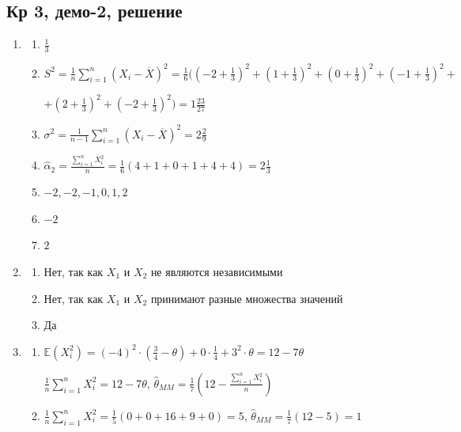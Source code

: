 \documentclass[12pt, a4paper]{article}\usepackage[]{graphicx}\usepackage[]{color}
\begin{document}
\subsection{Кр 3, демо-2, решение}



\begin{enumerate}
	\item
		\begin{enumerate}
			\item $\frac{1}{3}$
			\item
					$S^2 = \frac{1}{n} \sum_{i=1}^n (X_i - \overline{X})^2 = \frac{1}{6} ( \left(-2 + \frac{1}{3}\right)^2 + \left(1 + \frac{1}{3} \right)^2 + \left(0 + \frac{1}{3}\right)^2 + \left(-1 + \frac{1}{3}\right)^2 + $

					$   + \left(2+ \frac{1}{3}\right)^2 + \left(-2+ \frac{1}{3}\right)^2 ) = 1\frac{23}{27}$

			\item $\sigma^2 = \frac{1}{n-1} \sum_{i=1}^n (X_i - \overline{X})^2 =2 \frac{2}{9}$
			\item $\hat{\alpha}_2 = \frac{\sum_{i=1}^n X_i^2}{n} = \frac{1}{6} (4 + 1 + 0 + 1 + 4 + 4) = 2\frac{1}{3}$
			\item $-2, -2, -1, 0, 1, 2$
			\item $-2$
			\item $2$
		\end{enumerate}

	\item
		\begin{enumerate}
			\item Нет,  так как $X_1$ и  $X_2$ не являются независимыми
			\item Нет,  так как $X_1$ и  $X_2$ принимают разные множества значений
			\item Да
		\end{enumerate}

	\item
		\begin{enumerate}
			\item $\mathbb{E}(X_i^2) = (-4)^2 \cdot \left(\frac{3}{4} - \theta\right) + 0\cdot \frac{1}{4}+ 3^2 \cdot \theta = 12 - 7\theta$

			$\frac{1}{n} \sum_{i=1}^n X_i^2 = 12 - 7\theta$, $\hat{\theta}_{MM} = \frac{1}{7} \left(12-\frac{\sum_{i=1}^n X_i^2}{n} \right)$
			\item $\frac{1}{n}\sum_{i=1}^n X_i^2 = \frac{1}{5}(0 + 0 + 16  + 9+ 0) = 5$, $\hat{\theta}_{MM} =\frac{1}{7} (12-5)= 1$
		\end{enumerate}


\end{enumerate}
\end{document}

